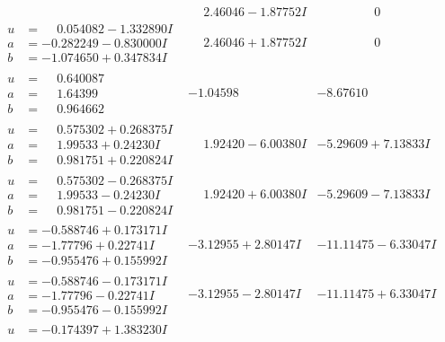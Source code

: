 \documentclass[1p]{elsarticle_modified}
\theoremstyle{definition}
\begin{document}
$$\begin{array}{c|c|c}
 & \phantom{-}2.46046 - 1.87752 I & \phantom{-0.000000 } 0 \\ \hline\begin{aligned}
u &= \phantom{-}0.054082 - 1.332890 I \\
a &= -0.282249 - 0.830000 I \\
b &= -1.074650 + 0.347834 I\end{aligned}
 & \phantom{-}2.46046 + 1.87752 I & \phantom{-0.000000 } 0 \\ \hline\begin{aligned}
u &= \phantom{-}0.640087\phantom{ +0.000000I} \\
a &= \phantom{-}1.64399\phantom{ +0.000000I} \\
b &= \phantom{-}0.964662\phantom{ +0.000000I}\end{aligned}
 & -1.04598\phantom{ +0.000000I} & -8.67610\phantom{ +0.000000I} \\ \hline\begin{aligned}
u &= \phantom{-}0.575302 + 0.268375 I \\
a &= \phantom{-}1.99533 + 0.24230 I \\
b &= \phantom{-}0.981751 + 0.220824 I\end{aligned}
 & \phantom{-}1.92420 - 6.00380 I & -5.29609 + 7.13833 I \\ \hline\begin{aligned}
u &= \phantom{-}0.575302 - 0.268375 I \\
a &= \phantom{-}1.99533 - 0.24230 I \\
b &= \phantom{-}0.981751 - 0.220824 I\end{aligned}
 & \phantom{-}1.92420 + 6.00380 I & -5.29609 - 7.13833 I \\ \hline\begin{aligned}
u &= -0.588746 + 0.173171 I \\
a &= -1.77796 + 0.22741 I \\
b &= -0.955476 + 0.155992 I\end{aligned}
 & -3.12955 + 2.80147 I & -11.11475 - 6.33047 I \\ \hline\begin{aligned}
u &= -0.588746 - 0.173171 I \\
a &= -1.77796 - 0.22741 I \\
b &= -0.955476 - 0.155992 I\end{aligned}
 & -3.12955 - 2.80147 I & -11.11475 + 6.33047 I \\ \hline\begin{aligned}
u &= -0.174397 + 1.383230 I \\

\end{aligned}
\end{array}$$
\end{document}
